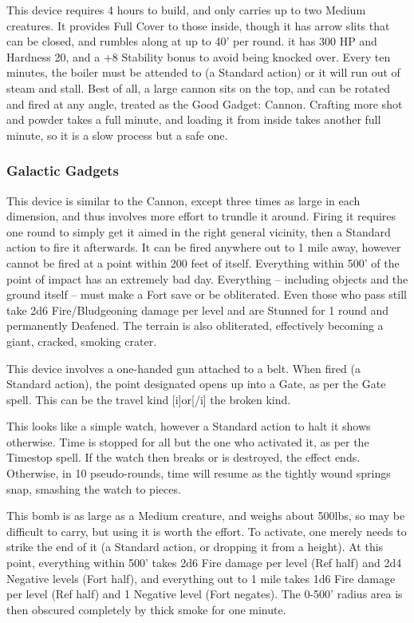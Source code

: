 {This device requires 4 hours to build, and only carries up to two Medium creatures. It provides Full Cover to those inside, though it has arrow slits that can be closed, and rumbles along at up to 40' per round. it has 300 HP and Hardness 20, and a +8 Stability bonus to avoid being knocked over. Every ten minutes, the boiler must be attended to (a Standard action) or it will run out of steam and stall. Best of all, a large cannon sits on the top, and can be rotated and fired at any angle, treated as the Good Gadget: Cannon. Crafting more shot and powder takes a full minute, and loading it from inside takes another full minute, so it is a slow process but a safe one.}

\subsubsection{Galactic Gadgets}

{This device is similar to the Cannon, except three times as large in each dimension, and thus involves more effort to trundle it around. Firing it requires one round to simply get it aimed in the right general vicinity, then a Standard action to fire it afterwards. It can be fired anywhere out to 1 mile away, however cannot be fired at a point within 200 feet of itself. Everything within 500' of the point of impact has an extremely bad day. Everything -- including objects and the ground itself -- must make a Fort save or be obliterated. Even those who pass still take 2d6 Fire/Bludgeoning damage per level and are Stunned for 1 round and permanently Deafened. The terrain is also obliterated, effectively becoming a giant, cracked, smoking crater.}

{This device involves a one-handed gun attached to a belt. When fired (a Standard action), the point designated opens up into a Gate, as per the Gate spell. This can be the travel kind [i]or[/i] the broken kind.}

{This looks like a simple watch, however a Standard action to halt it shows otherwise. Time is stopped for all but the one who activated it, as per the Timestop spell. If the watch then breaks or is destroyed, the effect ends. Otherwise, in 10 pseudo-rounds, time will resume as the tightly wound springs snap, smashing the watch to pieces.}

{This bomb is as large as a Medium creature, and weighs about 500lbs, so may be difficult to carry, but using it is worth the effort. To activate, one merely needs to strike the end of it (a Standard action, or dropping it from a height). At this point, everything within 500' takes 2d6 Fire damage per level (Ref half) and 2d4 Negative levels (Fort half), and everything out to 1 mile takes 1d6 Fire damage per level (Ref half) and 1 Negative level (Fort negates). The 0-500' radius area is then obscured completely by thick smoke for one minute.}

